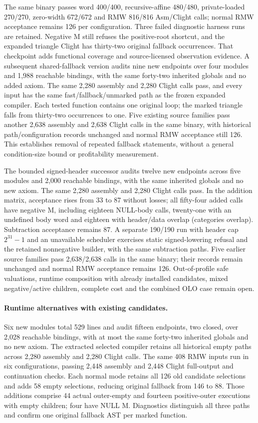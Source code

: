 The same binary passes word 400/400, recursive-affine 480/480,
private-loaded 270/270, zero-width 672/672 and RMW 816/816 Asm/Clight calls;
normal RMW acceptance remains 126 per configuration. Three failed diagnostic
harness runs are retained. Negative M still refuses the positive-root shortcut, and the
expanded triangle Clight has thirty-two original fallback occurrences.
That checkpoint adds functional coverage and source-licensed observation
evidence. A subsequent shared-fallback version audits nine new endpoints over
four modules and 1,988 reachable bindings, with the same forty-two inherited
globals and no added axiom. The same 2,280 assembly and 2,280 Clight calls pass,
and every input has the same fast/fallback/unmarked path as the frozen expanded
compiler. Each tested function contains one original loop; the marked triangle
falls from thirty-two occurrences to one. Five existing source families pass
another 2,638 assembly and 2,638 Clight calls in the same binary, with historical
path/configuration records unchanged and normal RMW acceptance still 126.
This establishes removal of repeated
fallback statements, without a general condition-size bound or profitability
measurement.

The bounded signed-header successor audits twelve new endpoints across five
modules and 2,000 reachable bindings, with the same inherited globals and no
new axiom. The same 2,280 assembly and 2,280 Clight calls pass. In the addition
matrix, acceptance rises from 33 to 87 without losses; all fifty-four added
calls have negative M, including eighteen NULL-body calls, twenty-one with an
undefined body word and eighteen with header/data overlap (categories overlap).
Subtraction acceptance remains 87. A separate 190/190 run with header cap
$2^{31}-1$ and an unavailable scheduler exercises static signed-lowering refusal
and the retained nonnegative builder, with the same subtraction paths. Five
earlier source families pass 2,638/2,638 calls in the same binary; their records
remain unchanged and normal RMW acceptance remains 126. Out-of-profile safe
valuations, runtime composition with already installed candidates, mixed
negative/active children, complete cost and the combined OLO case remain open.

\paragraph{Runtime alternatives with existing candidates.}
Six new modules total 529 lines and audit fifteen endpoints, two closed, over
2,028 reachable bindings, with at most the same forty-two inherited globals
and no new axiom. The extracted selected compiler retains all historical empty
paths across 2,280 assembly and 2,280 Clight calls. The same 408 RMW inputs run
in six configurations, passing 2,448 assembly and 2,448 Clight full-output and
continuation checks. Each normal mode retains all 126 old candidate selections
and adds 58 empty selections, reducing original fallback from 146 to 88.
Those additions comprise 44 actual outer-empty and fourteen positive-outer
executions with empty children; four have NULL M. Diagnostics distinguish all
three paths and confirm one original fallback AST per marked function.

